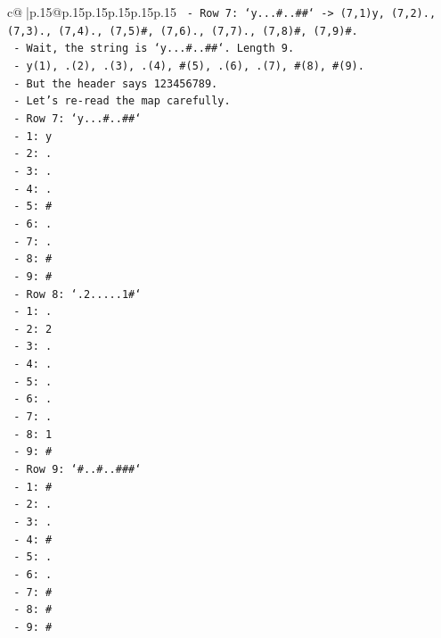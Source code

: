 \documentclass{article}
\begin{document}
{\begin{supertabular}{c@{$\;$}|p{.15\linewidth}@{}p{.15\linewidth}p{.15\linewidth}p{.15\linewidth}p{.15\linewidth}p{.15\linewidth}}
{{{\texttt{    {-} Row 7: `y...\#..\#\#` {-}> (7,1)y, (7,2)., (7,3)., (7,4)., (7,5)\#, (7,6)., (7,7)., (7,8)\#, (7,9)\#.} \\
\texttt{    {-} Wait, the string is `y...\#..\#\#`. Length 9.} \\
\texttt{    {-} y(1), .(2), .(3), .(4), \#(5), .(6), .(7), \#(8), \#(9).} \\
\texttt{    {-} But the header says 123456789.} \\
\texttt{    {-} Let's re{-}read the map carefully.} \\
\texttt{    {-} Row 7: `y...\#..\#\#`} \\
\texttt{      {-} 1: y} \\
\texttt{      {-} 2: .} \\
\texttt{      {-} 3: .} \\
\texttt{      {-} 4: .} \\
\texttt{      {-} 5: \#} \\
\texttt{      {-} 6: .} \\
\texttt{      {-} 7: .} \\
\texttt{      {-} 8: \#} \\
\texttt{      {-} 9: \#} \\
\texttt{    {-} Row 8: `.2.....1\#`} \\
\texttt{      {-} 1: .} \\
\texttt{      {-} 2: 2} \\
\texttt{      {-} 3: .} \\
\texttt{      {-} 4: .} \\
\texttt{      {-} 5: .} \\
\texttt{      {-} 6: .} \\
\texttt{      {-} 7: .} \\
\texttt{      {-} 8: 1} \\
\texttt{      {-} 9: \#} \\
\texttt{    {-} Row 9: `\#..\#..\#\#\#`} \\
\texttt{      {-} 1: \#} \\
\texttt{      {-} 2: .} \\
\texttt{      {-} 3: .} \\
\texttt{      {-} 4: \#} \\
\texttt{      {-} 5: .} \\
\texttt{      {-} 6: .} \\
\texttt{      {-} 7: \#} \\
\texttt{      {-} 8: \#} \\
\texttt{      {-} 9: \#} \\
}}}
\end{supertabular}}
\end{document}
